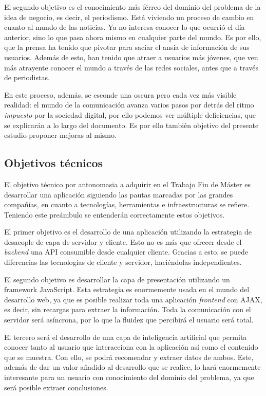 El segundo objetivo es el conocimiento más férreo del dominio del problema de la idea de negocio, es decir, el periodismo. Está viviendo un proceso de cambio en cuanto al mundo de las noticias. Ya no interesa conocer lo que ocurrió el día anterior, sino lo que pasa ahora mismo en cualquier parte del mundo. Es por ello, que la prensa ha tenido que pivotar para saciar el ansia de información de sus usuarios. Además de esto, han tenido que atraer a usuarios más jóvenes, que ven más atrayente conocer el mundo a través de las redes sociales, antes que a través de periodistas.

En este proceso, además, se esconde una oscura pero cada vez más visible realidad: el mundo de la comunicación avanza varios pasos por detrás del ritmo \textit{impuesto} por la sociedad digital, por ello podemos ver múltiple deficiencias, que se explicarán a lo largo del documento. Es por ello también objetivo del presente estudio proponer mejoras al mismo.

\subsection{Objetivos técnicos}

El objetivo técnico por antonomasia a adquirir en el Trabajo Fin de Máster es desarrollar una aplicación siguiendo las pautas marcadas por las grandes compañías, en cuanto a tecnologías, herramientas e infraestructuras se refiere. Teniendo este preámbulo se entenderán correctamente estos objetivos.

El primer objetivo es el desarrollo de una aplicación utilizando la estrategia de desacople de capa de servidor y cliente. Esto no es más que ofrecer desde el \textit{backend} una API consumible desde cualquier cliente. Gracias a esto, se puede diferencias las tecnologías de cliente y servidor, haciéndolas independientes.

El segundo objetivo es desarrollar la capa de presentación utilizando un framework JavaScript. Esta estrategia es enormemente usada en el mundo del desarrollo web, ya que es posible realizar toda una aplicación \textit{frontend} con AJAX, es decir, sin recargas para extraer la información. Toda la comunicación con el servidor será asíncrona, por lo que la fluidez que percibirá el usuario será total.

El tercero será el desarrollo de una capa de inteligencia artificial que permita conocer tanto al usuario que interacciona con la aplicación así como el contenido que se muestra. Con ello, se podrá recomendar y extraer datos de ambos. Este, además de dar un valor añadido al desarrollo que se realice, lo hará enormemente interesante para un usuario con conocimiento del dominio del problema, ya que será posible extraer conclusiones.

